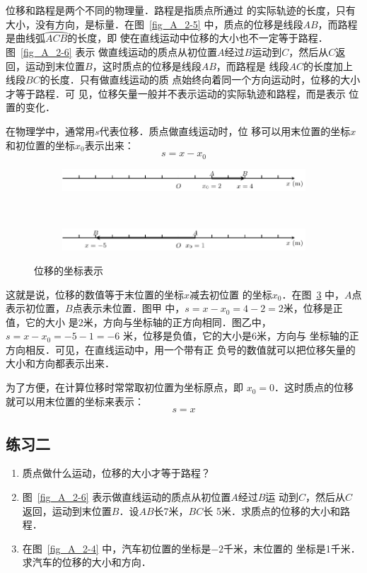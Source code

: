     位移和路程是两个不同的物理量．路程是指质点所通过
的实际轨迹的长度，只有大小，没有方向，是标量．在图~\ref{fig_A_2-5} 
中，质点的位移是线段$AB$，而路程是曲线弧$\wideparen{ACB}$的长度，即
使在直线运动中位移的大小也不一定等于路程．图~\ref{fig_A_2-6} 表示
做直线运动的质点从初位置$A$经过$B$运动到$C$，然后从$C$返
回，运动到末位置$B$，这时质点的位移是线段$AB$，而路程是
线段$AC$的长度加上线段$BC$的长度．只有做直线运动的质
点始终向着同一个方向运动时，位移的大小才等于路程．可
见，位移矢量一般并不表示运动的实际轨迹和路程，而是表示
位置的变化．

    在物理学中，通常用$s$代表位移．质点做直线运动时，位
移可以用末位置的坐标$x$和初位置的坐标$x_0$表示出来：
\[s=x-x_0\]
\begin{figure}[htp]
    \centering
    \begin{subfigure} {1\linewidth} 
		\centering
		\includegraphics{fig/A/2-7a.pdf} 
		\caption{}\label{fig_A_2-7a} 
	\end{subfigure} 
	\\
    \begin{subfigure} {1\linewidth} 
        \centering
        \includegraphics{fig/A/2-7b.pdf} 
        \caption{}\label{fig_A_2-7b} 
    \end{subfigure} 
    \caption{位移的坐标表示}\label{fig_A_2-7}
\end{figure}

这就是说，位移的数值等于末位置的坐标$x$减去初位置
的坐标$x_0$．在图~\ref{fig_A_2-7} 中，$A$点表示初位置，$B$点表示未位置．图甲
中，$s=x-x_0=4-2=2$米，位移是正值，它的大小
是2米，方向与坐标轴的正方向相同．图乙中，$s=x-x_0=-5-1=-6$
米，位移是负值，它的大小是6米，方向与
坐标轴的正方向相反．可见，在直线运动中，用一个带有正
负号的数值就可以把位移矢量的大小和方向都表示出来．

    为了方便，在计算位移时常常取初位置为坐标原点，即
$x_0=0$．这时质点的位移就可以用末位置的坐标来表示：
\[s=x\]

\subsection*{练习二}
\begin{enumerate}
  \item   质点做什么运动，位移的大小才等于路程？
  \item  图~\ref{fig_A_2-6} 表示做直线运动的质点从初位置$A$经过$B$运
  动到$C$，然后从$C$返回，运动到末位置$B$．设$AB$长7米，$BC$长
  5米．求质点的位移的大小和路程．
  \item 在图~\ref{fig_A_2-4} 中，汽车初位置的坐标是$-2$千米，末位置的
  坐标是1千米．求汽车的位移的大小和方向．
  
\end{enumerate}


